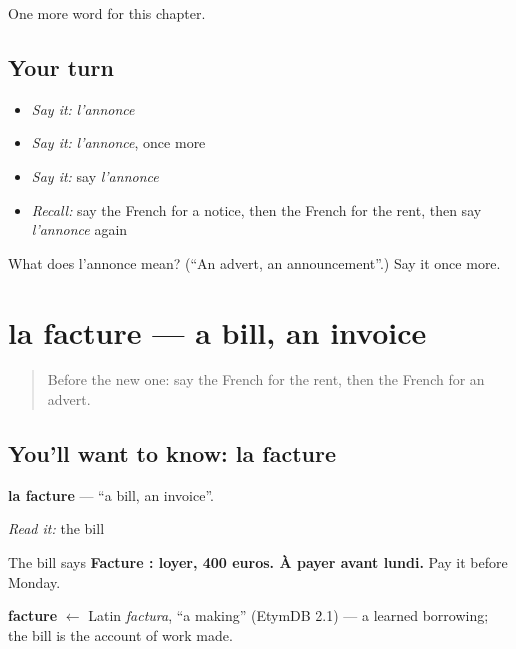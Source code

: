 \begin{grammarlens}[title={What you've built}]
One more word for this chapter.
\end{grammarlens}

\subsection*{Your turn}
\begin{itemize}
\raggedright
  \item \emph{Say it:} \emph{l'annonce}
  \item \emph{Say it:} \emph{l'annonce}, once more
  \item \emph{Say it:} say \emph{l'annonce}
  \item \emph{Recall:} say the French for a notice, then the French for the rent, then say \emph{l'annonce} again
\end{itemize}

\begin{tcolorbox}[breakable,colback=teal!4,colframe=teal!35!black,title={Before you move on}]
What does l'annonce mean? (\textquotedblleft{}An advert, an announcement\textquotedblright{}.) Say it once more.
\end{tcolorbox}
\section[la facture]{la facture — a bill, an invoice}

\label{lesson:FR-C142-la-facture}



\begin{quote}
Before the new one: say the French for the rent, then the French for an advert.
\end{quote}

\subsection*{You'll want to know: la facture}
\textbf{la facture} — \textquotedblleft{}a bill, an invoice\textquotedblright{}.

\emph{Read it:} the bill

The bill says \textbf{Facture : loyer, 400 euros. À payer avant lundi.} Pay it before Monday.

\begin{cousinweb}
\textbf{facture} $\leftarrow$ Latin \emph{factura}, \textquotedblleft{}a making\textquotedblright{} (EtymDB 2.1) — a learned borrowing; the bill is the account of work made.
\end{cousinweb}

